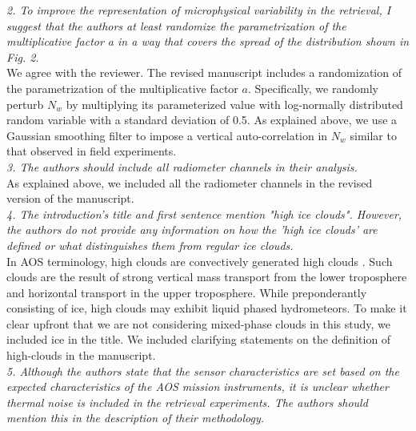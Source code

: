 \documentclass[12pt]{article}
\begin{document}
\noindent
\textit{2. To improve the representation of microphysical variability in the retrieval, I suggest that the authors at 
    least randomize the parametrization of the multiplicative factor a in a way that covers the spread of the distribution 
    shown in Fig. 2.}\\
\newline
We agree with the reviewer. The revised manuscript includes a randomization of the parametrization of the multiplicative factor $a$.  Specifically,
we randomly perturb $N_w$ by multiplying its parameterized value with log-normally distributed
random variable with a standard deviation of 0.5.  As explained above, we use a Gaussian smoothing filter to impose a vertical auto-correlation in
$N_w$ similar to that observed in field experiments.\\
\newline
\textit{3. The authors should include all radiometer channels in their analysis.}\\
\newline
As explained above, we included all the radiometer channels in the revised version of the manuscript.\\
\newline
\textit{4. The introduction's title and first sentence mention "high ice clouds". However, the authors do not provide any 
    information on how the 'high ice clouds' are defined or what distinguishes them from regular ice clouds.}\\
\newline
In AOS terminology, high clouds are convectively generated high clouds \cite{braun2022}. Such clouds are the result of strong vertical mass transport 
from the lower troposphere and horizontal transport in the upper troposphere.  While preponderantly consisting of ice, high clouds may exhibit 
liquid phased hydrometeors. To make it clear upfront that we are not considering mixed-phase clouds in this study, we included ice in the title.
We included clarifying statements on the definition of high-clouds in the manuscript. \\
\newline
\textit{5. Although the authors state that the sensor characteristics are set based on the expected characteristics of the 
    AOS mission instruments, it is unclear whether thermal noise is included in the retrieval experiments. 
    The authors should mention this in the description of their methodology.}\\
\newline
\end{document}
